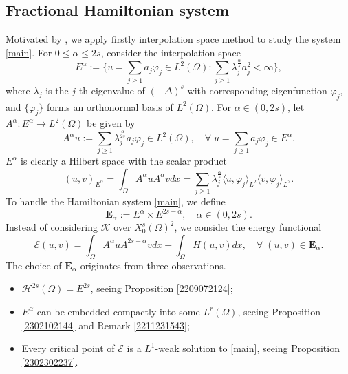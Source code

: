 \documentclass[10pt]{article}
\numberwithin{equation}{section}
\numberwithin{equation}{section}
\begin{document}
\subsection{Fractional Hamiltonian system}
Motivated by \cite{Hv1993, dF1994}, we apply firstly interpolation space method to study the system \eqref{main}. For $0\le\alpha\le 2s$, consider the interpolation space
\begin{equation}\label{2406191546}
E^\alpha:=\Big\{u=\sum_{j\ge 1}a_j\varphi_j\in L^2(\Omega): \sum_{j\ge 1}\lambda_j^{\frac{\alpha}{s}}a_j^2<\infty \Big\},
\end{equation}
where $\lambda_j$ is the $j$-th eigenvalue of $(-\Delta)^s$ with corresponding eigenfunction $\varphi_j$, and $\{\varphi_j\}$ forms an orthonormal basis of $L^2(\Omega)$. For $\alpha \in (0, 2s)$, let $A^{\alpha}: E^{\alpha}\to L^{2}(\Omega)$ be given by
\begin{equation}\label{2406191601}
A^{\alpha}u:=\sum_{j\ge 1}\lambda_j^{\frac{\alpha}{2s}}a_j\varphi_j \in L^2(\Omega),\quad \forall \;u=\sum_{j\ge 1}a_j\varphi_j\in E^\alpha.
\end{equation}
$E^\alpha$ is clearly a Hilbert space with the scalar product
\[
(u,v)_{E^\alpha}= \int_{\Omega}A^{\alpha}uA^{\alpha}v dx = \sum_{j\ge 1}\lambda_j^{\frac{\alpha}{s}}\langle u, \varphi_j\rangle_{L^2}\langle v, \varphi_j\rangle_{L^2}.
\]
To handle the Hamiltonian system \eqref{main}, we define
\[
\mathbf{E}_{\alpha}:=E^{\alpha}\times E^{2s-\alpha}, \quad \mbox{$\alpha \in (0, 2s)$}.
\]
Instead of considering $\mathcal K$ over $X_0^s(\Omega)^2$, we consider the energy functional
\begin{equation}\label{2306171702}
\mathcal{E}(u,v)=\int_{\Omega}A^{\alpha}uA^{2s-\alpha}v dx-\int_{\Omega}H(u, v) dx,\quad \forall\; (u,v)\in \mathbf{E}_{\alpha}.
\end{equation}
The choice of $\mathbf{E}_{\alpha}$ originates from three observations.
\begin{itemize}
\item $\mathcal{H}^{2s}(\Omega) = E^{2s}$, seeing Proposition \ref{2209072124};
\item $E^\alpha$ can be embedded compactly into some $L^r(\Omega)$, seeing Proposition \ref{2302102144} and Remark \ref{2211231543};
\item Every critical point of $\mathcal{E}$ is a $L^1$-weak solution to \eqref{main}, seeing Proposition \ref{2302302237}.
\end{itemize}
\end{document}
